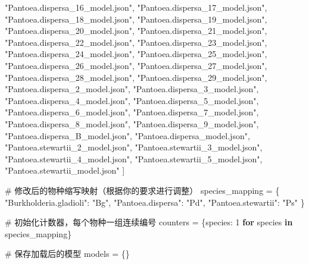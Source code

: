 \documentclass[
  letterpaper,
  DIV=11,
  numbers=noendperiod]{scrartcl}
\newenvironment{Shaded}{\begin{snugshade}}{\end{snugshade}}
\newcommand{\CommentTok}[1]{\textcolor[rgb]{0.37,0.37,0.37}{#1}}
\newcommand{\ControlFlowTok}[1]{\textcolor[rgb]{0.00,0.23,0.31}{\textbf{#1}}}
\newcommand{\DecValTok}[1]{\textcolor[rgb]{0.68,0.00,0.00}{#1}}
\newcommand{\KeywordTok}[1]{\textcolor[rgb]{0.00,0.23,0.31}{\textbf{#1}}}
\newcommand{\NormalTok}[1]{\textcolor[rgb]{0.00,0.23,0.31}{#1}}
\newcommand{\OperatorTok}[1]{\textcolor[rgb]{0.37,0.37,0.37}{#1}}
\newcommand{\StringTok}[1]{\textcolor[rgb]{0.13,0.47,0.30}{#1}}
\begin{document}
\begin{Shaded}
\begin{Highlighting}[]
    \StringTok{"Pantoea.dispersa\_16\_model.json"}\NormalTok{,}
    \StringTok{"Pantoea.dispersa\_17\_model.json"}\NormalTok{,}
    \StringTok{"Pantoea.dispersa\_18\_model.json"}\NormalTok{,}
    \StringTok{"Pantoea.dispersa\_19\_model.json"}\NormalTok{,}
    \StringTok{"Pantoea.dispersa\_20\_model.json"}\NormalTok{,}
    \StringTok{"Pantoea.dispersa\_21\_model.json"}\NormalTok{,}
    \StringTok{"Pantoea.dispersa\_22\_model.json"}\NormalTok{,}
    \StringTok{"Pantoea.dispersa\_23\_model.json"}\NormalTok{,}
    \StringTok{"Pantoea.dispersa\_24\_model.json"}\NormalTok{,}
    \StringTok{"Pantoea.dispersa\_25\_model.json"}\NormalTok{,}
    \StringTok{"Pantoea.dispersa\_26\_model.json"}\NormalTok{,}
    \StringTok{"Pantoea.dispersa\_27\_model.json"}\NormalTok{,}
    \StringTok{"Pantoea.dispersa\_28\_model.json"}\NormalTok{,}
    \StringTok{"Pantoea.dispersa\_29\_model.json"}\NormalTok{,}
    \StringTok{"Pantoea.dispersa\_2\_model.json"}\NormalTok{,}
    \StringTok{"Pantoea.dispersa\_3\_model.json"}\NormalTok{,}
    \StringTok{"Pantoea.dispersa\_4\_model.json"}\NormalTok{,}
    \StringTok{"Pantoea.dispersa\_5\_model.json"}\NormalTok{,}
    \StringTok{"Pantoea.dispersa\_6\_model.json"}\NormalTok{,}
    \StringTok{"Pantoea.dispersa\_7\_model.json"}\NormalTok{,}
    \StringTok{"Pantoea.dispersa\_8\_model.json"}\NormalTok{,}
    \StringTok{"Pantoea.dispersa\_9\_model.json"}\NormalTok{,}
    \StringTok{"Pantoea.dispersa\_B\_model.json"}\NormalTok{,}
    \StringTok{"Pantoea.dispersa\_model.json"}\NormalTok{,}
    \StringTok{"Pantoea.stewartii\_2\_model.json"}\NormalTok{,}
    \StringTok{"Pantoea.stewartii\_3\_model.json"}\NormalTok{,}
    \StringTok{"Pantoea.stewartii\_4\_model.json"}\NormalTok{,}
    \StringTok{"Pantoea.stewartii\_5\_model.json"}\NormalTok{,}
    \StringTok{"Pantoea.stewartii\_model.json"}
\NormalTok{]}

\CommentTok{\# 修改后的物种缩写映射（根据你的要求进行调整）}
\NormalTok{species\_mapping }\OperatorTok{=}\NormalTok{ \{}
    \StringTok{"Burkholderia.gladioli"}\NormalTok{: }\StringTok{"Bg"}\NormalTok{,}
    \StringTok{"Pantoea.dispersa"}\NormalTok{: }\StringTok{"Pd"}\NormalTok{,}
    \StringTok{"Pantoea.stewartii"}\NormalTok{: }\StringTok{"Ps"}
\NormalTok{\}}

\CommentTok{\# 初始化计数器，每个物种一组连续编号}
\NormalTok{counters }\OperatorTok{=}\NormalTok{ \{species: }\DecValTok{1} \ControlFlowTok{for}\NormalTok{ species }\KeywordTok{in}\NormalTok{ species\_mapping\}}

\CommentTok{\# 保存加载后的模型}
\NormalTok{models }\OperatorTok{=}\NormalTok{ \{\}}


\end{Highlighting}
\end{Shaded}
\end{document}
